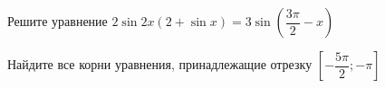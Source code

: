 \begin{ex}
	\begin{condition}
		\begin{enumcols}[label=\asbuk*)]
			\item Решите уравнение \( 2\sin 2x\left(2+\sin x\right)= 3\sin{\left(\dfrac{3\pi}{2}-x\right)} \)
			\item Найдите все корни уравнения, принадлежащие отрезку \(  \left[-\dfrac{5\pi}{2};-\pi\right] \)
		\end{enumcols}
	\end{condition}
\end{ex}